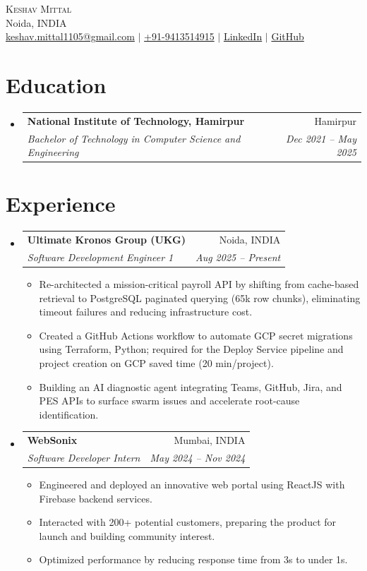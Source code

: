 \documentclass[letterpaper,11pt]{article}
\makeatletter
\newcommand{\resumeItem}[1]{
  \item\small{
    {#1 \vspace{-2pt}}
  }
}
\newcommand{\resumeSubheading}[4]{
  \vspace{-2pt}\item
    \begin{tabular*}{0.97\textwidth}[t]{l@{\extracolsep{\fill}}r}
      \textbf{#1} & #2 \\
      \textit{\small#3} & \textit{\small #4} \\
    \end{tabular*}\vspace{-7pt}
}
\newcommand{\resumeSubHeadingListStart}{\begin{itemize}[leftmargin=0.15in, label={}]}
\newcommand{\resumeSubHeadingListEnd}{\end{itemize}}
\newcommand{\resumeItemListStart}{\begin{itemize}}
\newcommand{\resumeItemListEnd}{\end{itemize}\vspace{-5pt}}
\makeatother
\begin{document}
\begin{center}
    {\Huge \scshape Keshav Mittal} \\ \vspace{1pt}
    Noida, INDIA \\ 
    \small \href{mailto:keshav.mittal1105@gmail.com}{keshav.mittal1105@gmail.com} $|$ 
    \href{tel:+91-9413514915}{+91-9413514915} $|$ 
    \href{https://linkedin.com/in/keshav-mittal}{LinkedIn} $|$
    \href{https://github.com/keshav-mittal}{GitHub}
\end{center}


\section{Education}
\resumeSubHeadingListStart

      \resumeSubheading
      {National Institute of Technology, Hamirpur}{Hamirpur}
      {Bachelor of Technology in Computer Science and Engineering}{Dec 2021 -- May 2025}
      \resumeSubHeadingListEnd

\section{Experience}
\resumeSubHeadingListStart

      \resumeSubheading
      {Ultimate Kronos Group (UKG)}{Noida, INDIA}
      {Software Development Engineer 1}{Aug 2025 -- Present}
      \resumeItemListStart
      \resumeItem{Re-architected a mission-critical payroll API by shifting from cache-based retrieval to PostgreSQL paginated querying (65k row chunks), eliminating timeout failures and reducing infrastructure cost.}
\resumeItem{Created a GitHub Actions workflow to automate GCP secret migrations using Terraform, Python; required for the Deploy Service pipeline and project creation on GCP saved time (20 min/project).}
\resumeItem{Building an AI diagnostic agent integrating Teams, GitHub, Jira, and PES APIs to surface swarm issues and accelerate root-cause identification.}
\resumeItemListEnd

      \resumeSubheading
      {WebSonix}{Mumbai, INDIA}
      {Software Developer Intern}{May 2024 -- Nov 2024}
      \resumeItemListStart
      \resumeItem{Engineered and deployed an innovative web portal using ReactJS with Firebase backend services.}
\resumeItem{Interacted with 200+ potential customers, preparing the product for launch and building community interest.}
\resumeItem{Optimized performance by reducing response time from 3s to under 1s.}
\resumeItemListEnd
\resumeSubHeadingListEnd
\end{document}
